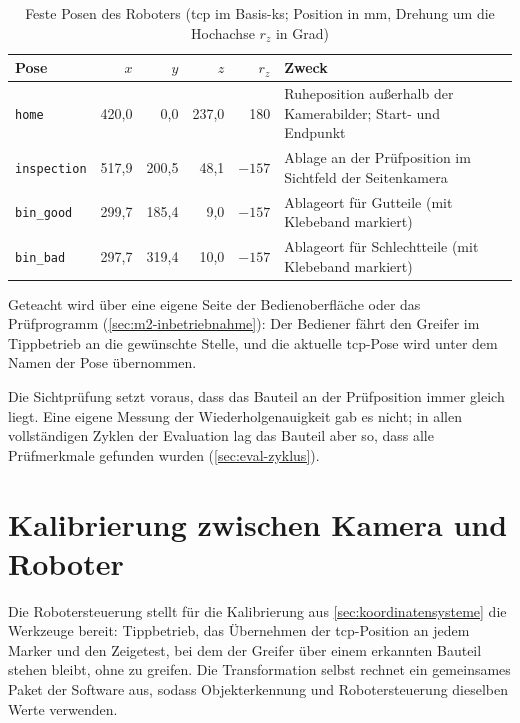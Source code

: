 \begin{table}[htbp]
  \centering
  \caption[Feste Posen des Roboters]{Feste Posen des Roboters (\ac{tcp} im Basis-\ac{ks};
  Position in mm, Drehung um die Hochachse $r_z$ in Grad)}
  \label{tab:m2-posen}
  \begin{tabularx}{\textwidth}{@{}l r r r r X@{}}
    \toprule
    Pose & $x$ & $y$ & $z$ & $r_z$ & Zweck \\
    \midrule
    \texttt{home} & 420,0 & 0,0 & 237,0 & 180 & Ruheposition außerhalb der Kamerabilder;
      Start- und Endpunkt \\
    \texttt{inspection} & 517,9 & 200,5 & 48,1 & $-157$ & Ablage an der Prüfposition im
      Sichtfeld der Seitenkamera \\
    \texttt{bin\_good} & 299,7 & 185,4 & 9,0 & $-157$ & Ablageort für Gutteile (mit Klebeband
      markiert) \\
    \texttt{bin\_bad} & 297,7 & 319,4 & 10,0 & $-157$ & Ablageort für Schlechtteile (mit
      Klebeband markiert) \\
    \bottomrule
  \end{tabularx}
\end{table}

Geteacht wird über eine eigene Seite der Bedienoberfläche oder das Prüfprogramm
(\cref{sec:m2-inbetriebnahme}): Der Bediener fährt den Greifer im Tippbetrieb an die
gewünschte Stelle, und die aktuelle \ac{tcp}-Pose wird unter dem Namen der Pose übernommen.

Die Sichtprüfung setzt voraus, dass das Bauteil an der Prüfposition immer gleich liegt. Eine
eigene Messung der Wiederholgenauigkeit gab es nicht; in allen vollständigen Zyklen der
Evaluation lag das Bauteil aber so, dass alle Prüfmerkmale gefunden wurden
(\cref{sec:eval-zyklus}).

\section{Kalibrierung zwischen Kamera und Roboter}
\label{sec:m2-kalibrierung}

Die Robotersteuerung stellt für die Kalibrierung aus \cref{sec:koordinatensysteme} die
Werkzeuge bereit: Tippbetrieb, das Übernehmen der \ac{tcp}-Position an jedem Marker und den
Zeigetest, bei dem der Greifer über einem erkannten Bauteil stehen bleibt, ohne zu greifen.
Die Transformation selbst rechnet ein gemeinsames Paket der Software aus, sodass
Objekterkennung und Robotersteuerung dieselben Werte verwenden.

